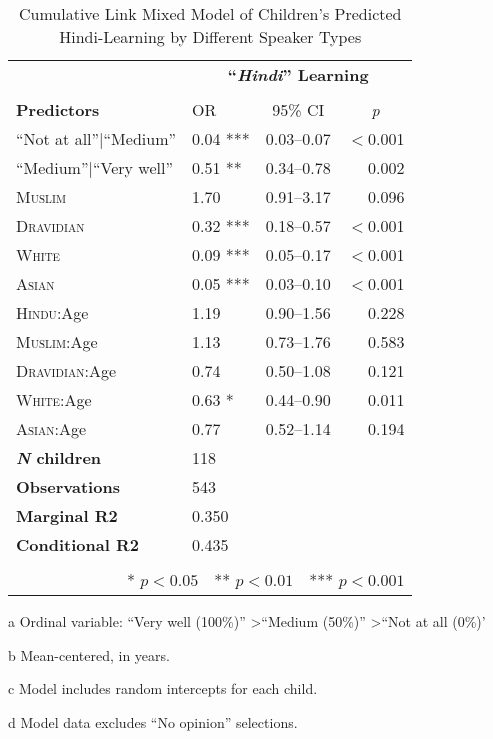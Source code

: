 \begin{table*}[t]
\small
\caption{Cumulative Link Mixed Model of Children's Predicted Hindi-Learning by Different Speaker Types}\label{tab:wealth-ord}
    \centering
    \vspace{5pt}
\begin{threeparttable}
\begin{tabular}{llcr}
 \toprule
& \multicolumn{3}{c}{\textbf{``\textit{Hindi}'' Learning}\tnote{a}} \\
\cline{2-4} \\[-.75em]
\textbf{Predictors} & {OR} & {95\% CI} & \multicolumn{1}{c}{\textit{p}} \\ 
\midrule
``Not at all''$|$``Medium'' & 0.04 *** & 0.03--0.07 & $<$0.001 \\ 
  ``Medium''$|$``Very well'' & 0.51 ** & 0.34--0.78 & 0.002 \\ 
  \textsc{Muslim} & 1.70 & 0.91--3.17 & 0.096 \\ 
  \textsc{Dravidian} & 0.32 *** & 0.18--0.57 & $<$0.001 \\ 
  \textsc{White} & 0.09 *** & 0.05--0.17 & $<$0.001 \\ 
  \textsc{Asian} & 0.05 *** & 0.03--0.10 & $<$0.001 \\ 
\textsc{Hindu}:Age\tnote{b} & 1.19 & 0.90--1.56 & 0.228 \\ 
  \textsc{Muslim}:Age & 1.13 & 0.73--1.76 & 0.583 \\ 
  \textsc{Dravidian}:Age & 0.74 & 0.50--1.08 & 0.121 \\ 
  \textsc{White}:Age & 0.63 * & 0.44--0.90 & 0.011 \\ 
  \textsc{Asian}:Age & 0.77 & 0.52--1.14 & 0.194 \\ 
\midrule
\bfseries{\textit{N} children}\tnote{c} & 118 &  &  \\ 
\textbf{Observations}\tnote{d} & 543 &  &  \\ 
 \textbf{Marginal R2} & 0.350 &  &  \\ 
 \textbf{Conditional R2}& 0.435 &  &  \\ 
 \bottomrule\\[-.75em]
\multicolumn{4}{r}{* $p<0.05$~~** $p<0.01$~~*** $p<0.001$}\\
\end{tabular}
\begin{tablenotes}[flushleft]
    \item[a] Ordinal variable: ``Very well (100\%)'' \textgreater ``Medium (50\%)'' \textgreater ``Not at all (0\%)'
    \item[b] Mean-centered, in years.
    \item[c] Model includes random intercepts for each child.
    \item[d] Model data excludes ``No opinion'' selections. 
\end{tablenotes}
\end{threeparttable}
\end{table*}

